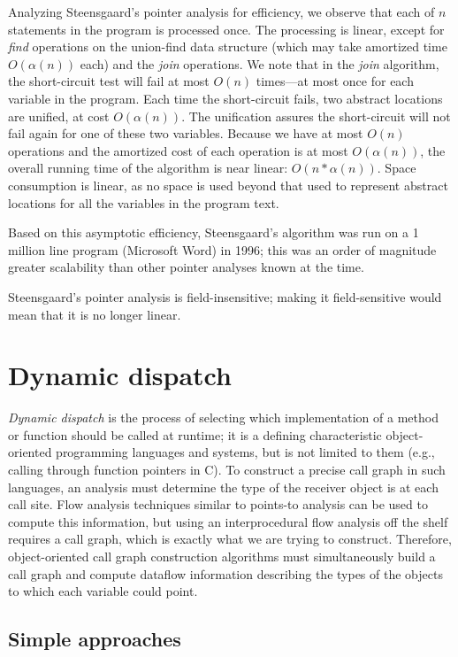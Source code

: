 \documentclass[11pt]{article}
\begin{document}
Analyzing Steensgaard's pointer analysis for efficiency, we observe that each of
$n$ statements in the program is processed once. The processing is linear,
except for \textit{find} operations on the union-find data structure (which may
take amortized time $O(\alpha(n))$ each) and the \textit{join} operations. We
note that in the \textit{join} algorithm, the short-circuit test will fail at
most $O(n)$ times---at most once for each variable in the program. Each time the
short-circuit fails, two abstract locations are unified, at cost $O(\alpha(n))$.
The unification assures the short-circuit will not fail again for one of these
two variables. Because we have at most $O(n)$ operations and the amortized cost
of each operation is at most $O(\alpha(n))$, the overall running time of the
algorithm is near linear: $O(n * \alpha(n))$. Space consumption is linear, as no
space is used beyond that used to represent abstract locations for all the
variables in the program text.

Based on this asymptotic efficiency, Steensgaard's algorithm was run on a 1
million line program (Microsoft Word) in 1996; this was an order of magnitude
greater scalability than other pointer analyses known at the time.

Steensgaard's pointer analysis is field-insensitive; making it field-sensitive
would mean that it is no longer linear.

\section{Dynamic dispatch}

\emph{Dynamic dispatch} is the process of selecting which implementation of a
method or function should be called at runtime; it is a defining characteristic
object-oriented programming languages and systems, but is not limited to them
(e.g., calling through function pointers in C). To construct a precise call
graph in such languages, an analysis must determine the type of the receiver
object is at each call site. Flow analysis techniques similar to points-to
analysis can be used to compute this information, but using an interprocedural
flow analysis off the shelf requires a call graph, which is exactly what we are
trying to construct. Therefore, object-oriented call graph construction
algorithms must simultaneously build a call graph and compute dataflow
information describing the types of the objects to which each variable could
point.

\subsection{Simple approaches}
\end{document}
